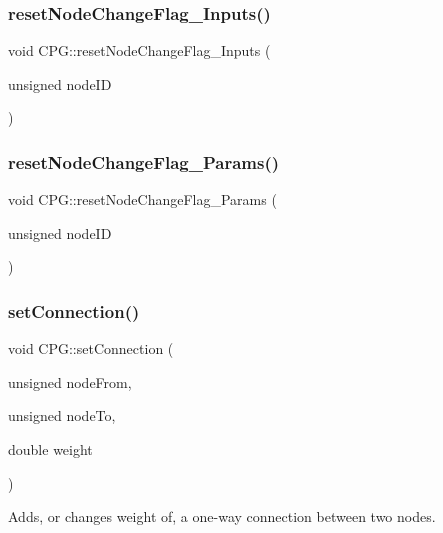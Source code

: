 \subsubsection{\texorpdfstring{reset\+Node\+Change\+Flag\+\_\+\+Inputs()}{resetNodeChangeFlag\_Inputs()}}
{\footnotesize\ttfamily void C\+P\+G\+::reset\+Node\+Change\+Flag\+\_\+\+Inputs (\begin{DoxyParamCaption}\item[{unsigned}]{node\+ID }\end{DoxyParamCaption})}

\mbox{\label{classCPG_a4bc2674914fb92eddb4cb0e67562cb64}} 
\subsubsection{\texorpdfstring{reset\+Node\+Change\+Flag\+\_\+\+Params()}{resetNodeChangeFlag\_Params()}}
{\footnotesize\ttfamily void C\+P\+G\+::reset\+Node\+Change\+Flag\+\_\+\+Params (\begin{DoxyParamCaption}\item[{unsigned}]{node\+ID }\end{DoxyParamCaption})}

\mbox{\label{classCPG_ae23852907b96b57b7c45a53e9abf3146}} 
\subsubsection{\texorpdfstring{set\+Connection()}{setConnection()}\hspace{0.1cm}{\footnotesize\ttfamily [1/2]}}
{\footnotesize\ttfamily void C\+P\+G\+::set\+Connection (\begin{DoxyParamCaption}\item[{unsigned}]{node\+From,  }\item[{unsigned}]{node\+To,  }\item[{double}]{weight }\end{DoxyParamCaption})}



Adds, or changes weight of, a one-\/way connection between two nodes. 

